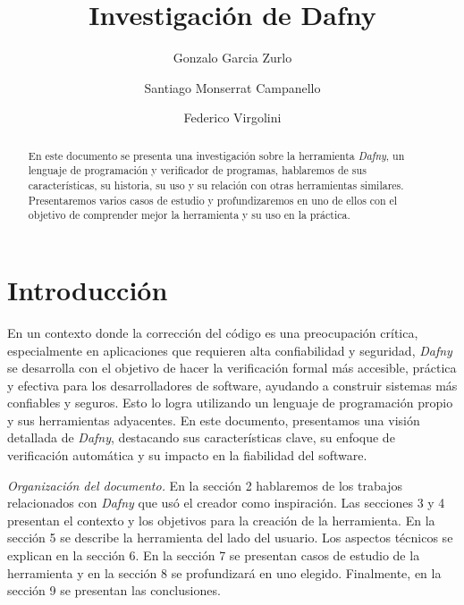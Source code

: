 \documentclass[runningheads]{llncs}
\begin{document}
%
\title{Investigación de Dafny}
%
\author{Gonzalo Garcia Zurlo \and
Santiago Monserrat Campanello \and
Federico Virgolini}
%
%
%
\maketitle
\begin{abstract}
En este documento se presenta una investigación sobre la herramienta \textit{Dafny}, un lenguaje de programación y verificador de programas,
hablaremos de sus características, su historia, su uso y su relación con otras herramientas similares. 
Presentaremos varios casos de estudio y profundizaremos en uno de ellos con el objetivo de comprender mejor la herramienta y su uso en la práctica.
\end{abstract}

\section{Introducción}

En un contexto donde la corrección del código es una preocupación crítica, especialmente en aplicaciones que requieren alta confiabilidad y seguridad,
\textit{Dafny} se desarrolla con el objetivo de hacer la verificación formal más accesible, práctica y efectiva para los desarrolladores de software, 
ayudando a construir sistemas más confiables y seguros.
Esto lo logra utilizando un lenguaje de programación propio y sus herramientas adyacentes.
En este documento, presentamos una visión detallada de \textit{Dafny}, 
destacando sus características clave, su enfoque de verificación automática y su impacto en la fiabilidad del software.

\emph{Organización del documento.} En la sección 2 hablaremos de los trabajos relacionados con \textit{Dafny} que usó el creador como inspiración.
Las secciones 3 y 4 presentan el contexto y los objetivos para la creación de la herramienta.
En la sección 5 se describe la herramienta del lado del usuario. Los aspectos técnicos se explican en la sección 6.
En la sección 7 se presentan casos de estudio de la herramienta y en la sección 8 se profundizará en uno elegido. 
Finalmente, en la sección 9 se presentan las conclusiones.
\end{document}
